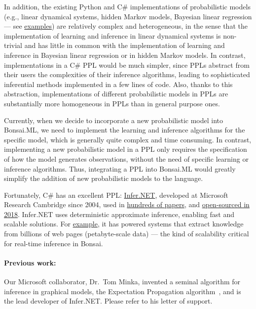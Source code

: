 In addition, the existing Python and C\# implementations of probabilistic
models (e.g., linear dynamical systems, hidden Markov models, Bayesian linear
regression — see
\href{https://bonsai-rx.org/machinelearning/examples/README.html}{examples})
are relatively complex and heterogeneous, in the sense that the implementation
of learning and inference in linear dynamical systems is non-trivial and has
little in common with the implementation of learning and inference in Bayesian
linear regression or in hidden Markov models.
%
In contrast, implementations in a C\# PPL would be much simpler, since PPLs
abstract from their users the complexities of their inference algorithms,
leading to sophisticated inferential methods implemented in a few lines of
code.
%
Also, thanks to this abstraction, implementations of different probabilistic
models in PPLs are substantially more homogeneous in PPLs than in general
purpose ones.

Currently, when we decide to incorporate a new probabilistic model into
Bonsai.ML, we need to implement the learning and inference algorithms for the
specific model, which is generally quite complex and time consuming.
%
In contrast, implementing a new probabilistic model in a PPL only requires the
specification of how the model generates observations, without the
need of specific learning or inference algorithms.
%
Thus, integrating a PPL into Bonsai.ML would greatly simplify the addition of
new probabilistic models to the language.

Fortunately, C\# has an excellent PPL:
\href{https://dotnet.github.io/infer/}{Infer.NET}, developed at Microsoft
Research Cambridge since 2004, used in
\href{https://dotnet.github.io/infer/papers.html}{hundreds of papers}, and
\href{https://www.microsoft.com/en-us/research/blog/the-microsoft-infer-net-machine-learning-framework-goes-open-source/}{open-sourced
in 2018}.  Infer.NET uses deterministic approximate inference, enabling fast
and scalable solutions. For
\href{https://www.microsoft.com/en-us/research/blog/the-microsoft-infer-net-machine-learning-framework-goes-open-source/}{example},
it has powered systems that extract knowledge from billions of web pages
(petabyte-scale data) — the kind of scalability critical for real-time
inference in Bonsai.

\paragraph{Previous work:} Our Microsoft collaborator, Dr.~Tom Minka, invented
a seminal algorithm for inference in graphical models, the Expectation
Propagation algorithm~\citep{minka01}, and is the lead developer of Infer.NET.
Please refer to his letter of support.

